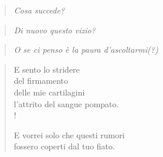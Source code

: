 
\begin{verse}
    \hfill \textit{Cosa succede?}
\end{verse}
\vspace{-0.9cm}
\begin{verse}
    \hfill \textit{Di nuovo questo vizio?}
\end{verse}
\vspace{-0.9cm}
\begin{verse}
    \hfill \textit{O se ci penso è la paura d'ascoltarmi(?)}
\end{verse}

\begin{verse}
    E sento lo stridere\\
    del firmamento\\
    delle mie cartilagini\\
    l'attrito del sangue pompato.\\!

    E vorrei solo che questi rumori\\
    fossero coperti dal tuo fiato.
\end{verse}